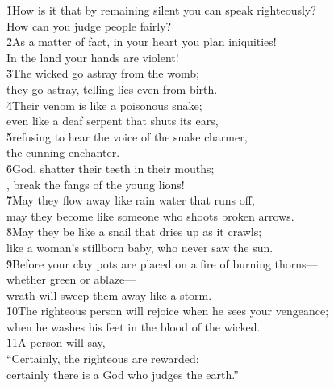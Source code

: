 \begin{poetry}
\poeml \v{1}How is it that by remaining silent you can speak righteously? \\
\poemll    How can you judge people fairly? \\
\poeml \v{2}As a matter of fact, in your heart you plan iniquities! \\
\poemll    In the land your hands are violent! \\
\poeml \v{3}The wicked go astray from the womb; \\
\poemll    they go astray, telling lies even from birth. \\
\poeml \v{4}Their venom is like a poisonous snake; \\
\poemll    even like a deaf serpent that shuts its ears, \\
\poeml \v{5}refusing to hear the voice of the snake charmer, \\
\poemll    the cunning enchanter. \\
\poeml \v{6}God, shatter their teeth in their mouths; \\
\poemll    {}, break the fangs of the young lions! \\
\poeml \v{7}May they flow away like rain water that runs off, \\
\poemll    may they become like someone who shoots broken arrows. \\
\poeml \v{8}May they be like a snail that dries up as it crawls; \\
\poemll    like a woman's stillborn baby, who never saw the sun. \\
\poeml \v{9}Before your clay pots are placed on a fire of burning thorns--- \\
\poemll    whether green or ablaze--- \\
\poemlll       wrath will sweep them away like a storm. \\
\poeml \v{10}The righteous person will rejoice when he sees your vengeance; \\
\poemll    when he washes his feet in the blood of the wicked. \\
\poeml \v{11}A person will say, \\
\poemll    ``Certainly, the righteous are rewarded; \\
\poemlll       certainly there is a God who judges the earth.''
\end{poetry}

